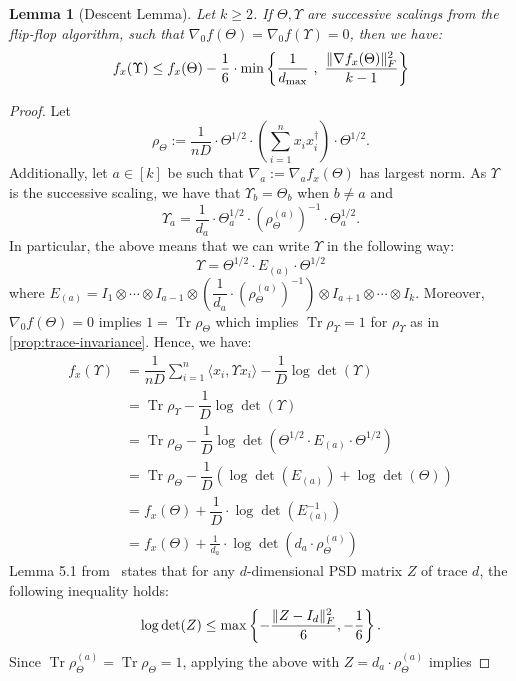 \documentclass[aos]{imsart}
\newtheorem{lemma}[theorem]{Lemma}
\theoremstyle{definition}
\numberwithin{equation}{section}
\DeclareMathOperator{\tr}{Tr}
\DeclarePairedDelimiter{\norm}{\lVert}{\rVert}
\def\dmax{d_{\max}}
\begin{document}
\begin{lemma}[Descent Lemma]\label{lem:tensor-descent-lemma}
	Let $k \geq 2$. If $\Theta, \Upsilon$ are successive scalings from the flip-flop algorithm, such that $\nabla_0 f(\Theta) = \nabla_0 f(\Upsilon) = 0$, then we have:
	$$ f_x(\Upsilon) \leq f_x(\Theta) - \dfrac{1}{6} \cdot \min\left\{ \dfrac{1}{\dmax} \ , \ \dfrac{\norm{\nabla f_x(\Theta)}_F^2}{k - 1} \right\} $$
\end{lemma}
\begin{proof}
	Let
	$$\rho_\Theta := \dfrac{1}{nD} \cdot  \Theta^{1/2} \cdot \left( \sum_{i=1}^n x_i x_i^\dagger \right) \cdot \Theta^{1/2}.$$
	Additionally, let $a \in [k]$ be such that $\nabla_a := \nabla_a f_x(\Theta)$ has largest norm.
	As $\Upsilon$ is the successive scaling, we have that $\Upsilon_b = \Theta_b$ when $b \neq a$ and
	$$ \Upsilon_a = \dfrac{1}{d_a} \cdot \Theta_a^{1/2} \cdot (\rho_\Theta^{(a)})^{-1} \cdot \Theta_a^{1/2}. $$
	In particular, the above means that we can write $\Upsilon$ in the following way:
	$$ \Upsilon = \Theta^{1/2} \cdot  E_{(a)} \cdot \Theta^{1/2} $$
	where $E_{(a)} = I_1 \otimes \cdots \otimes I_{a-1} \otimes \left( \dfrac{1}{d_a} \cdot (\rho_\Theta^{(a)})^{-1} \right) \otimes I_{a+1} \otimes \cdots \otimes I_k$. Moreover, $\nabla_0 f(\Theta) = 0$ implies $1 = \tr \rho_\Theta$ which implies $\tr \rho_\Upsilon = 1$ for $\rho_\Upsilon$ as in \cref{prop:trace-invariance}.  
	Hence, we have:
	\begin{align*}
		f_x(\Upsilon) &= \dfrac{1}{nD} \sum_{i=1}^n \langle x_i , \Upsilon x_i \rangle - \dfrac{1}{D} \log \det(\Upsilon) \\
		&=\tr \rho_\Upsilon- \dfrac{1}{D} \log \det(\Upsilon) \\
		&= \tr \rho_\Theta - \dfrac{1}{D} \log \det(\Theta^{1/2} \cdot  E_{(a)} \cdot \Theta^{1/2}) \\
		&= \tr \rho_\Theta - \dfrac{1}{D} \left( \log \det(E_{(a)}) + \log\det(\Theta) \right) \\
		&= f_x(\Theta) + \dfrac{1}{D} \cdot \log \det\left( E_{(a)}^{-1} \right) \\
		&= f_x(\Theta) + \frac{1}{d_a} \cdot  \log\det\left( d_a \cdot \rho_\Theta^{(a)} \right)
	\end{align*}
	Lemma 5.1 from~\cite{GGOW19} states that for any $d$-dimensional PSD matrix $Z$ of trace $d$, the following inequality holds:
	$$ \log\det(Z) \leq \max\left\{- \dfrac{\norm{Z - I_d}_F^2}{6}, - \dfrac{1}{6} \right\}. $$
	Since $\tr \rho_\Theta^{(a)} = \tr \rho_\Theta = 1$, applying the above with $Z = d_a \cdot \rho_\Theta^{(a)}$ implies

\end{proof}
\end{document}

